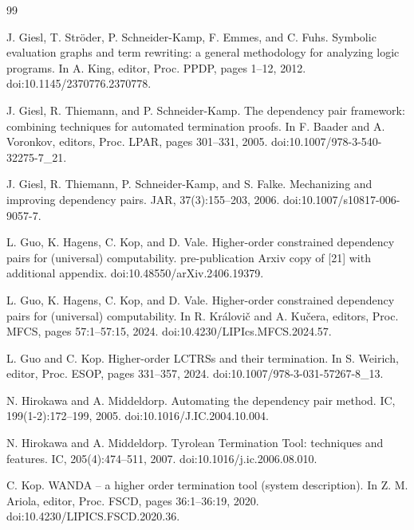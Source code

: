 \documentclass[10pt,a4paper]{amsart}
\begin{document}
\begin{thebibliography}{99}
\par\noindent  [17]  J. Giesl, T. Ströder, P. Schneider-Kamp, F. Emmes, and C. Fuhs.  Symbolic evaluation graphs and term rewriting: a general methodology for analyzing logic programs.  In A. King, editor, Proc. PPDP, pages 1–12, 2012.  doi:10.1145/2370776.2370778.  
 
\par\noindent  [18]  J. Giesl, R. Thiemann, and P. Schneider-Kamp.  The dependency pair framework: combining techniques for automated termination proofs.  In F. Baader and A. Voronkov, editors, Proc. LPAR, pages 301–331, 2005.  doi:10.1007/978-3-540-32275-7\_21.  
 
\par\noindent  [19]  J. Giesl, R. Thiemann, P. Schneider-Kamp, and S. Falke.  Mechanizing and improving dependency pairs.  JAR, 37(3):155–203, 2006.  doi:10.1007/s10817-006-9057-7.  
 
\par\noindent  [20]  L. Guo, K. Hagens, C. Kop, and D. Vale.  Higher-order constrained dependency pairs for (universal) computability.  pre-publication Arxiv copy of [21] with additional appendix.  doi:10.48550/arXiv.2406.19379.  
 
\par\noindent  [21]  L. Guo, K. Hagens, C. Kop, and D. Vale.  Higher-order constrained dependency pairs for (universal) computability.  In R. Královič and A. Kučera, editors, Proc. MFCS, pages 57:1–57:15, 2024.  doi:10.4230/LIPIcs.MFCS.2024.57.  
 
\par\noindent  [22]  L. Guo and C. Kop.  Higher-order LCTRSs and their termination.  In S. Weirich, editor, Proc. ESOP, pages 331–357, 2024.  doi:10.1007/978-3-031-57267-8\_13.  
 
\par\noindent  [23]  N. Hirokawa and A. Middeldorp.  Automating the dependency pair method.  IC, 199(1-2):172–199, 2005.  doi:10.1016/J.IC.2004.10.004.  
 
\par\noindent  [24]  N. Hirokawa and A. Middeldorp.  Tyrolean Termination Tool: techniques and features.  IC, 205(4):474–511, 2007.  doi:10.1016/j.ic.2006.08.010.  
 
\par\noindent  [25]  C. Kop.  WANDA – a higher order termination tool (system description).  In Z. M. Ariola, editor, Proc. FSCD, pages 36:1–36:19, 2020.  doi:10.4230/LIPICS.FSCD.2020.36.  
 

\end{thebibliography}
\end{document}
